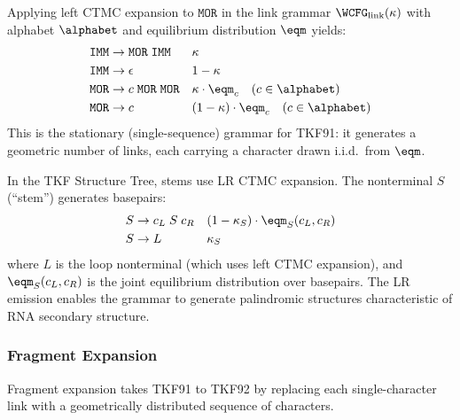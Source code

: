 \begin{example}[TKF91]
\label{ex:ctmc-tkf91-appendix}
Applying left CTMC expansion to $\texttt{MOR}$ in the link grammar
$\WCFG_{\mathrm{link}}(\kappa)$ with alphabet $\alphabet$
and equilibrium distribution $\eqm$ yields:
\begin{align*}
\texttt{IMM} &\to \texttt{MOR}\;\texttt{IMM} && \kappa \\
\texttt{IMM} &\to \epsilon && 1-\kappa \\
\texttt{MOR} &\to c\;\texttt{MOR}\;\texttt{MOR} && \kappa \cdot \eqm_c \quad (c \in \alphabet)\\
\texttt{MOR} &\to c && (1-\kappa) \cdot \eqm_c \quad (c \in \alphabet)
\end{align*}
This is the stationary (single-sequence) grammar for TKF91:
it generates a geometric number of links, each carrying a character
drawn i.i.d.\ from $\eqm$.
\end{example}

\begin{example}
\label{ex:ctmc-lr-appendix}
In the TKF Structure Tree, stems use LR CTMC expansion.
The nonterminal $S$ (``stem'') generates basepairs:
\begin{align*}
S &\to c_L\;S\;c_R && (1-\kappa_S) \cdot \eqm_S(c_L, c_R) \\
S &\to L && \kappa_S
\end{align*}
where $L$ is the loop nonterminal (which uses left CTMC expansion),
and $\eqm_S(c_L, c_R)$ is the joint equilibrium distribution over
basepairs.  The LR emission enables the grammar to generate
palindromic structures characteristic of RNA secondary structure.
\end{example}

\subsubsection{Fragment Expansion}
\label{sec:fragment-appendix}

Fragment expansion takes TKF91 to TKF92 by replacing each single-character
link with a geometrically distributed sequence of characters.


